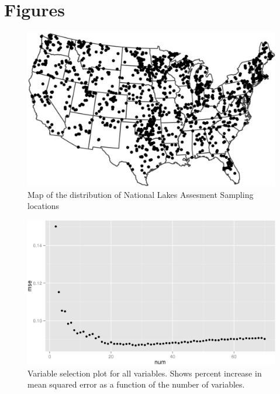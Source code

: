 \documentclass[11pt,]{article}
\begin{document}
\newpage

\section{Figures}\label{figures}

\begin{figure}[htbp]
\centering
\includegraphics{manuscript_files/figure-latex/fig1_nlaMap-1.jpeg}
\caption{Map of the distribution of National Lakes Assesment Sampling
locations \label{fig:nlaMap}}
\end{figure}

\newpage

\begin{figure}[htbp]
\centering
\includegraphics{manuscript_files/figure-latex/all_var_sel_figure-1.jpeg}
\caption{Variable selection plot for all variables. Shows percent
increase in mean squared error as a function of the number of variables.
\label{fig:all_varsel_figure}}
\end{figure}
\end{document}

